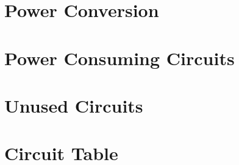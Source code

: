 \section{Power Conversion}

\section{Power Consuming Circuits}

\section{Unused Circuits}

\section{Circuit Table}

    \clearpage







